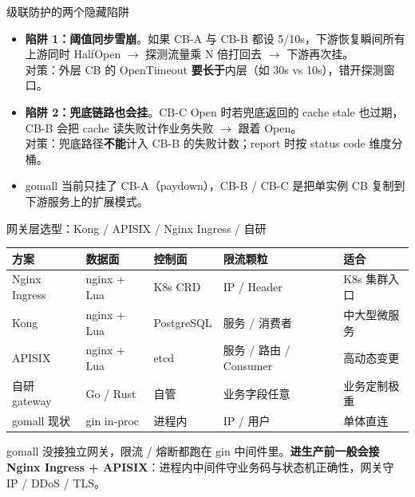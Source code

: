 \documentclass[aspectratio=169,11pt]{beamer}
\begin{document}
\begin{frame}[shrink]{级联防护的两个隐藏陷阱}
\begin{itemize}
  \item \textbf{陷阱 1：阈值同步雪崩}。如果 CB-A 与 CB-B 都设 5/10s，下游恢复瞬间所有上游同时 HalfOpen $\to$ 探测流量乘 N 倍打回去 $\to$ 下游再次挂。\\
  对策：外层 CB 的 OpenTimeout \textbf{要长于}内层（如 30s vs 10s），错开探测窗口。
  \item \textbf{陷阱 2：兜底链路也会挂}。CB-C Open 时若兜底返回的 cache stale 也过期，CB-B 会把 cache 读失败计作业务失败 $\to$ 跟着 Open。\\
  对策：兜底路径\textbf{不能}计入 CB-B 的失败计数；report 时按 status code 维度分桶。
  \item gomall 当前只挂了 CB-A（paydown），CB-B / CB-C 是把单实例 CB 复制到下游服务上的扩展模式。
\end{itemize}
\end{frame}

\begin{frame}[shrink]{网关层选型：Kong / APISIX / Nginx Ingress / 自研}
\begin{tabular}{@{}lllll@{}}
\toprule
方案 & 数据面 & 控制面 & 限流颗粒 & 适合 \\
\midrule
Nginx Ingress & nginx + Lua & K8s CRD & IP / Header & K8s 集群入口 \\
Kong          & nginx + Lua & PostgreSQL & 服务 / 消费者 & 中大型微服务 \\
APISIX        & nginx + Lua & etcd & 服务 / 路由 / Consumer & 高动态变更 \\
自研 gateway   & Go / Rust & 自管 & 业务字段任意 & 业务定制极重 \\
gomall 现状    & gin in-proc & 进程内 & IP / 用户 & 单体直连 \\
\bottomrule
\end{tabular}
\vspace{2mm}
\small gomall 没接独立网关，限流 / 熔断都跑在 gin 中间件里。\textbf{进生产前一般会接 Nginx Ingress + APISIX}：进程内中间件守业务码与状态机正确性，网关守 IP / DDoS / TLS。
\end{frame}
\end{document}
